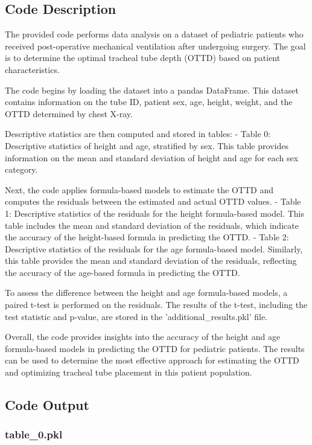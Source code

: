 \documentclass[11pt]{article}
\begin{document}
\subsection{Code Description}

The provided code performs data analysis on a dataset of pediatric patients who received post-operative mechanical ventilation after undergoing surgery. The goal is to determine the optimal tracheal tube depth (OTTD) based on patient characteristics.

The code begins by loading the dataset into a pandas DataFrame. This dataset contains information on the tube ID, patient sex, age, height, weight, and the OTTD determined by chest X-ray.

Descriptive statistics are then computed and stored in tables:
- Table 0: Descriptive statistics of height and age, stratified by sex. This table provides information on the mean and standard deviation of height and age for each sex category.

Next, the code applies formula-based models to estimate the OTTD and computes the residuals between the estimated and actual OTTD values.
- Table 1: Descriptive statistics of the residuals for the height formula-based model. This table includes the mean and standard deviation of the residuals, which indicate the accuracy of the height-based formula in predicting the OTTD.
- Table 2: Descriptive statistics of the residuals for the age formula-based model. Similarly, this table provides the mean and standard deviation of the residuals, reflecting the accuracy of the age-based formula in predicting the OTTD.

To assess the difference between the height and age formula-based models, a paired t-test is performed on the residuals. The results of the t-test, including the test statistic and p-value, are stored in the 'additional\_results.pkl' file.

Overall, the code provides insights into the accuracy of the height and age formula-based models in predicting the OTTD for pediatric patients. The results can be used to determine the most effective approach for estimating the OTTD and optimizing tracheal tube placement in this patient population.

\subsection{Code Output}

\subsubsection*{table\_0.pkl}
\end{document}
